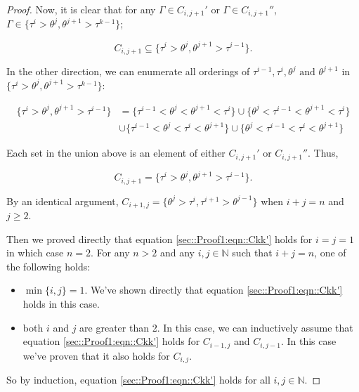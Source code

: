 \documentclass[12pt]{article}
\newcommand{\mb}{\mathbb}
\newcommand{\te}{\text}
\newcommand{\rt}[1]{\tau^{#1}}						%
\newcommand{\rtt}[1]{\theta^{#1}}					%
\renewcommand{\it}{k}								%
\newcommand{\itt}{i}								%
\newcommand{\ittt}{j}								%
\newcommand{\numb}{n}								%
\newcommand{\apath}{\Gamma}						%
\newcommand{\pathsete}[2]{C_{#1,#2}}			%
\begin{document}
\begin{proof}
Now, it is clear that for any \(\apath \in \pathsete{\itt}{\ittt+1}'\) or \(\apath \in \pathsete{\itt}{\ittt+1}''\), \(\apath\in \{\rt{\itt} > \rtt{\ittt},\rtt{\ittt+1} > \rt{\it-1}\}\);

\[\pathsete{\itt}{\ittt+1} \subseteq \{\rt{\itt} > \rtt{\ittt},\rtt{\ittt+1} > \rt{\itt-1}\}.\]

In the other direction, we can enumerate all orderings of \(\rt{\itt-1},\rt{\itt},\rtt{\ittt}\te{ and } \rtt{\ittt+1}\) in \(\{\rt{\itt} > \rtt{\ittt}, \rtt{\ittt+1} > \rt{\it-1}\}\):

\begin{align*}
\{\rt{\itt} > \rtt{\ittt},\rtt{\ittt+1} > \rt{\itt-1}\} &= \{\rt{\itt-1} < \rtt{\ittt} < \rtt{\ittt+1} < \rt{\itt}\} \cup \{\rtt{\ittt} < \rt{\itt-1} < \rtt{\ittt+1} < \rt{\itt}\}\\
&\cup \{\rt{\itt-1} < \rtt{\ittt} < \rt{\itt} < \rtt{\ittt+1}\} \cup \{\rtt{\ittt} < \rt{\itt-1} <\rt{\itt} < \rtt{\ittt+1}\}
\end{align*}

Each set in the union above is an element of either \(\pathsete{\itt}{\ittt+1}'\) or \(\pathsete{\itt}{\ittt+1}''\). Thus,

\[\pathsete{\itt}{\ittt+1} = \{\rt{\itt} > \rtt{\ittt},\rtt{\ittt+1} > \rt{\itt-1}\}.\]

By an identical argument, \(\pathsete{\itt+1}{\ittt} = \{\rtt{\ittt} > \rt{\itt},\rt{\itt+1} > \rtt{\ittt-1}\}\) when \(\itt + \ittt = \numb\) and \(\ittt \geq 2\).

Then we proved directly that equation \eqref{sec::Proof1:eqn::Ckk'} holds for \(\itt = \ittt=1\) in which case \(\numb = 2\). For any \(\numb > 2\) and any \(\itt,\ittt\in \mb{N}\) such that \(\itt + \ittt = \numb\), one of the following holds:

\begin{itemize}
\item \(\min\{\itt,\ittt\} = 1\). We've shown directly that equation \eqref{sec::Proof1:eqn::Ckk'} holds in this case.

\item both \(\itt\) and \(\ittt\) are greater than 2. In this case, we can inductively assume that equation \eqref{sec::Proof1:eqn::Ckk'} holds for \(\pathsete{\itt-1}{\ittt}\) and \(\pathsete{\itt}{\ittt-1}\). In this case we've proven that it also holds for \(\pathsete{\itt}{\ittt}\).
\end{itemize}

So by induction, equation \eqref{sec::Proof1:eqn::Ckk'} holds for all \(\itt,\ittt\in \mb{N}\).
\end{proof}
\end{document}
